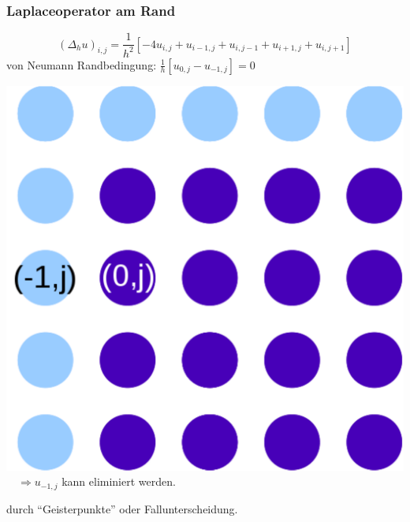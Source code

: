 \documentclass[10pt]{beamer}
\begin{document}
\frame
{
\frametitle{Laplaceoperator am Rand}

\begin{equation}
(\Delta_h u)_{i,j} = \frac{1}{h^2} \left[ -4 u_{i,j} + u_{i-1,j} + u_{i,j-1} + u_{i+1,j} + u_{i,j+1} \right]\nonumber
\end{equation}
von Neumann Randbedingung: $\frac{1}{h} \left[u_{0,j} - u_{-1,j}\right]=0$

\begin{center}
 \includegraphics[scale=0.25]{img/Gitter2.pdf} $\quad\Rightarrow u_{-1,j}$ kann eliminiert werden.
\end{center}
durch ``Geisterpunkte'' oder Fallunterscheidung.
}


\end{document}
